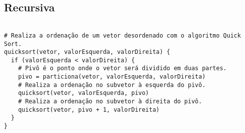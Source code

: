 \subsection{Recursiva}
\begin{verbatim}

# Realiza a ordenação de um vetor desordenado com o algoritmo Quick Sort.
quicksort(vetor, valorEsquerda, valorDireita) { 
  if (valorEsquerda < valorDireita) {
    # Pivô é o ponto onde o vetor será dividido em duas partes.
    pivo = particiona(vetor, valorEsquerda, valorDireita)
    # Realiza a ordenação no subvetor à esquerda do pivô.
    quicksort(vetor, valorEsquerda, pivo)
    # Realiza a ordenação no subvetor à direita do pivô.
    quicksort(vetor, pivo + 1, valorDireita) 
  }
}

\end{verbatim}

